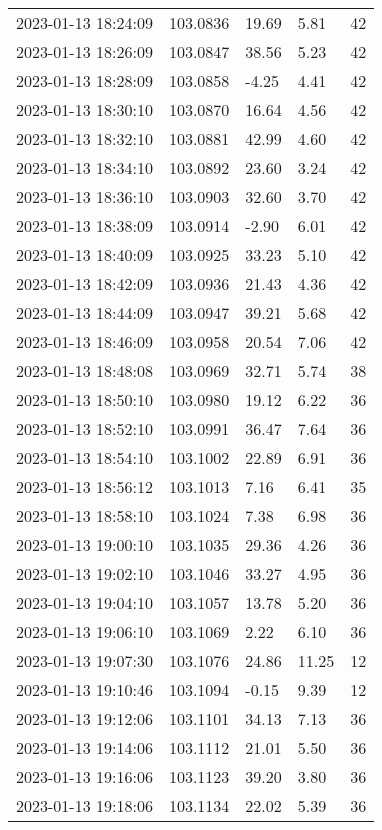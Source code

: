 \documentclass{nature_plusfigure}
\begin{document}
\begin{supplement}
\begin{center}
\begin{longtable}{lllll}
2023-01-13 18:24:09 & 103.0836 & 19.69 & 5.81 & 42 \\ 
2023-01-13 18:26:09 & 103.0847 & 38.56 & 5.23 & 42 \\ 
2023-01-13 18:28:09 & 103.0858 & -4.25 & 4.41 & 42 \\ 
2023-01-13 18:30:10 & 103.0870 & 16.64 & 4.56 & 42 \\ 
2023-01-13 18:32:10 & 103.0881 & 42.99 & 4.60 & 42 \\ 
2023-01-13 18:34:10 & 103.0892 & 23.60 & 3.24 & 42 \\ 
2023-01-13 18:36:10 & 103.0903 & 32.60 & 3.70 & 42 \\ 
2023-01-13 18:38:09 & 103.0914 & -2.90 & 6.01 & 42 \\ 
2023-01-13 18:40:09 & 103.0925 & 33.23 & 5.10 & 42 \\ 
2023-01-13 18:42:09 & 103.0936 & 21.43 & 4.36 & 42 \\ 
2023-01-13 18:44:09 & 103.0947 & 39.21 & 5.68 & 42 \\ 
2023-01-13 18:46:09 & 103.0958 & 20.54 & 7.06 & 42 \\ 
2023-01-13 18:48:08 & 103.0969 & 32.71 & 5.74 & 38 \\ 
2023-01-13 18:50:10 & 103.0980 & 19.12 & 6.22 & 36 \\ 
2023-01-13 18:52:10 & 103.0991 & 36.47 & 7.64 & 36 \\ 
2023-01-13 18:54:10 & 103.1002 & 22.89 & 6.91 & 36 \\ 
2023-01-13 18:56:12 & 103.1013 & 7.16 & 6.41 & 35 \\ 
2023-01-13 18:58:10 & 103.1024 & 7.38 & 6.98 & 36 \\ 
2023-01-13 19:00:10 & 103.1035 & 29.36 & 4.26 & 36 \\ 
2023-01-13 19:02:10 & 103.1046 & 33.27 & 4.95 & 36 \\ 
2023-01-13 19:04:10 & 103.1057 & 13.78 & 5.20 & 36 \\ 
2023-01-13 19:06:10 & 103.1069 & 2.22 & 6.10 & 36 \\ 
2023-01-13 19:07:30 & 103.1076 & 24.86 & 11.25 & 12 \\ 
2023-01-13 19:10:46 & 103.1094 & -0.15 & 9.39 & 12 \\ 
2023-01-13 19:12:06 & 103.1101 & 34.13 & 7.13 & 36 \\ 
2023-01-13 19:14:06 & 103.1112 & 21.01 & 5.50 & 36 \\ 
2023-01-13 19:16:06 & 103.1123 & 39.20 & 3.80 & 36 \\ 
2023-01-13 19:18:06 & 103.1134 & 22.02 & 5.39 & 36 \\ 

\end{longtable}
\end{center}
\end{supplement}
\end{document}
